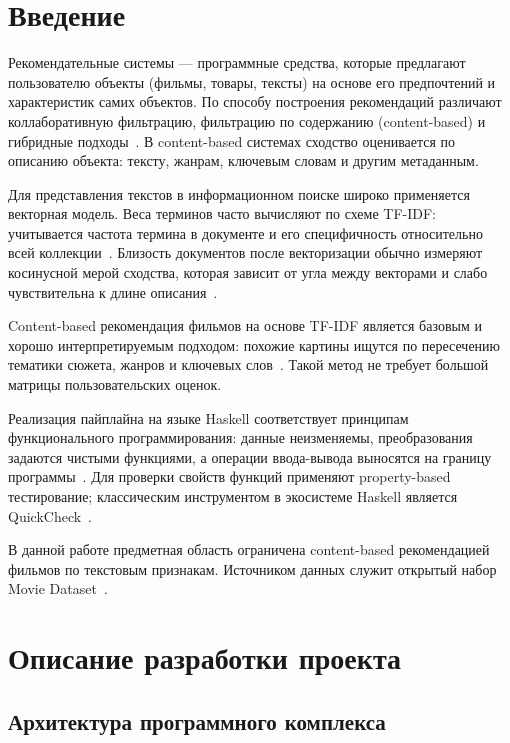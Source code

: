 \documentclass[a4paper, 16pt]{article}
\begin{document}
\tableofcontents
\newpage

\section*{Введение}

Рекомендательные системы --- программные средства, которые предлагают пользователю 
объекты (фильмы, товары, тексты) на основе его предпочтений и характеристик самих объектов. 
По способу построения рекомендаций различают коллаборативную фильтрацию, фильтрацию по 
содержанию (content-based) и гибридные подходы~\cite{wiki-recsys}. В content-based системах 
сходство оценивается по описанию объекта: тексту, жанрам, ключевым словам и другим метаданным.

Для представления текстов в информационном поиске широко применяется векторная модель. 
Веса терминов часто вычисляют по схеме TF-IDF: учитывается частота термина в документе и его специфичность 
относительно всей коллекции~\cite{manning2011,wiki-vsm}. Близость документов после векторизации обычно 
измеряют косинусной мерой сходства, которая зависит от угла между векторами и слабо чувствительна к 
длине описания~\cite{wiki-vsm}.

Content-based рекомендация фильмов на основе TF-IDF является базовым и хорошо интерпретируемым 
подходом: похожие картины ищутся по пересечению тематики сюжета, жанров и ключевых 
слов~\cite{wiki-recsys,konovalov-tfidf}. Такой метод не требует большой матрицы пользовательских оценок.

Реализация пайплайна на языке Haskell соответствует принципам функционального программирования: 
данные неизменяемы, преобразования задаются чистыми функциями, а операции ввода-вывода выносятся 
на границу программы~\cite{dushkin2006,kubensky2010}. Для проверки свойств функций применяют property-based 
тестирование; классическим инструментом в экосистеме Haskell является QuickCheck~\cite{claessen2000}.

В данной работе предметная область ограничена content-based рекомендацией фильмов по текстовым признакам. 
Источником данных служит открытый набор Movie Dataset~\cite{kaggle}.


\newpage

\section{Описание разработки проекта}

\subsection{Архитектура программного комплекса}
\end{document}
